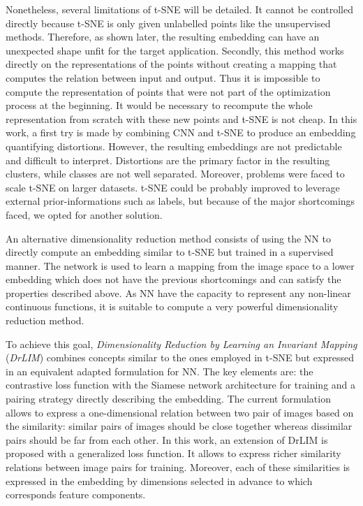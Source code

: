 \documentclass[a4paper,12pt]{report}
\begin{document}
Nonetheless, several limitations of t-SNE will be detailed.
It cannot be controlled directly because t-SNE is only given unlabelled points like the unsupervised methods.
Therefore, as shown later, the resulting embedding can have an unexpected shape unfit for the target application.
Secondly, this method works directly on the representations of the points without creating a mapping that computes the relation between input and output.
Thus it is impossible to compute the representation of points that were not part of the optimization process at the beginning.
It would be necessary to recompute the whole representation from scratch with these new points and t-SNE is not cheap.
In this work, a first try is made by combining CNN and t-SNE to produce an embedding quantifying distortions.
However, the resulting embeddings are not predictable and difficult to interpret.
Distortions are the primary factor in the resulting clusters, while classes are not well separated.
Moreover, problems were faced to scale t-SNE on larger datasets.
t-SNE could be probably improved to leverage external prior-informations such as labels, but because of the major shortcomings faced, we opted for another solution.

An alternative dimensionality reduction method consists of using the NN to directly compute an embedding similar to t-SNE but trained in a supervised manner.
The network is used to learn a mapping from the image space to a lower embedding which does not have the previous shortcomings and can satisfy the properties described above.
As NN have the capacity to represent any non-linear continuous functions\cite{csaji2001approximation}, it is suitable to compute a very powerful dimensionality reduction method.

To achieve this goal, {\em Dimensionality Reduction by Learning an Invariant Mapping} ({\em DrLIM}) combines concepts similar to the ones employed in t-SNE but expressed in an equivalent adapted formulation for NN\cite{hadsell2006dimensionality}.
The key elements are: the contrastive loss function with the Siamese network architecture for training and a pairing strategy directly describing the embedding.
The current formulation allows to express a one-dimensional relation between two pair of images based on the similarity: similar pairs of images should be close together whereas dissimilar pairs should be far from each other.
In this work, an extension of DrLIM is proposed with a generalized loss function.
It allows to express richer similarity relations between image pairs for training.
Moreover, each of these similarities is expressed in the embedding by dimensions selected in advance to which corresponds feature components.
\end{document}

